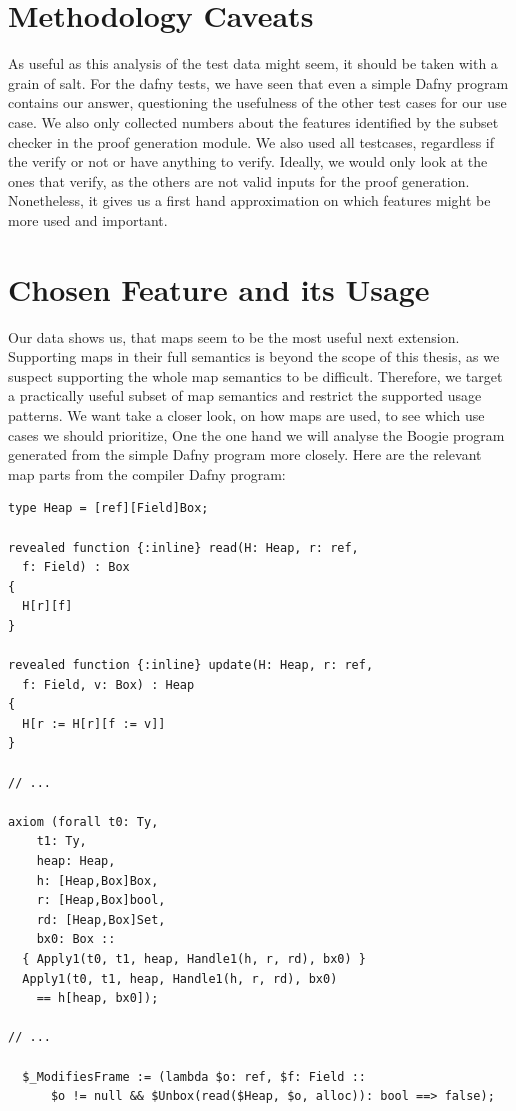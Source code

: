 \section{Methodology Caveats}

As useful as this analysis of the test data might seem, it should be taken with a grain of salt.
For the dafny tests, we have seen that even a simple Dafny program contains our answer,
questioning the usefulness of the other test cases for our use case.
We also only collected numbers about the features identified by the subset checker in the proof generation module.
We also used all testcases, regardless if the verify or not or have anything to verify.
Ideally, we would only look at the ones that verify, as the others are not valid inputs for the proof generation.
Nonetheless, it gives us a first hand approximation on which features might be more used and important.


\section{Chosen Feature and its Usage}
\label{sec:goals-to-support}

Our data shows us, that maps seem to be the most useful next extension.
Supporting maps in their full semantics is beyond the scope of this thesis,
as we suspect supporting the whole map semantics to be difficult.
Therefore, we target a practically useful subset of map semantics
and restrict the supported usage patterns.
We want take a closer look, on how maps are used, to see which use cases we should prioritize,
One the one hand we will analyse the Boogie program generated from the simple Dafny program more closely.
Here are the relevant map parts from the compiler Dafny program:

\begin{lstlisting}[caption={Compiled Dafny to Boogie Program Excerpt}]
type Heap = [ref][Field]Box;

revealed function {:inline} read(H: Heap, r: ref, 
  f: Field) : Box
{
  H[r][f]
}

revealed function {:inline} update(H: Heap, r: ref, 
  f: Field, v: Box) : Heap
{
  H[r := H[r][f := v]]
}

// ...

axiom (forall t0: Ty, 
    t1: Ty, 
    heap: Heap, 
    h: [Heap,Box]Box, 
    r: [Heap,Box]bool, 
    rd: [Heap,Box]Set, 
    bx0: Box :: 
  { Apply1(t0, t1, heap, Handle1(h, r, rd), bx0) } 
  Apply1(t0, t1, heap, Handle1(h, r, rd), bx0) 
    == h[heap, bx0]);

// ...

  $_ModifiesFrame := (lambda $o: ref, $f: Field :: 
      $o != null && $Unbox(read($Heap, $o, alloc)): bool ==> false);
\end{lstlisting}


